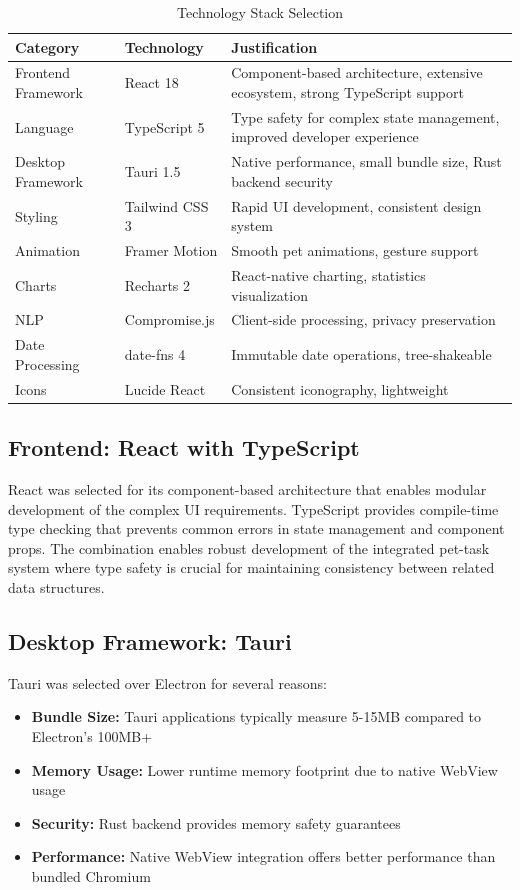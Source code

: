 \begin{table}[htbp]
\centering
\caption{Technology Stack Selection}
\label{tab:tech-stack}
\begin{tabular}{@{}llp{6cm}@{}}
\toprule
\textbf{Category} & \textbf{Technology} & \textbf{Justification} \\
\midrule
Frontend Framework & React 18 & Component-based architecture, extensive ecosystem, strong TypeScript support \\
Language & TypeScript 5 & Type safety for complex state management, improved developer experience \\
Desktop Framework & Tauri 1.5 & Native performance, small bundle size, Rust backend security \\
Styling & Tailwind CSS 3 & Rapid UI development, consistent design system \\
Animation & Framer Motion & Smooth pet animations, gesture support \\
Charts & Recharts 2 & React-native charting, statistics visualization \\
NLP & Compromise.js & Client-side processing, privacy preservation \\
Date Processing & date-fns 4 & Immutable date operations, tree-shakeable \\
Icons & Lucide React & Consistent iconography, lightweight \\
\bottomrule
\end{tabular}
\end{table}

\subsection{Frontend: React with TypeScript}

React was selected for its component-based architecture that enables modular development of the complex UI requirements. TypeScript provides compile-time type checking that prevents common errors in state management and component props. The combination enables robust development of the integrated pet-task system where type safety is crucial for maintaining consistency between related data structures.

\subsection{Desktop Framework: Tauri}

Tauri was selected over Electron for several reasons:
\begin{itemize}
    \item \textbf{Bundle Size:} Tauri applications typically measure 5-15MB compared to Electron's 100MB+
    \item \textbf{Memory Usage:} Lower runtime memory footprint due to native WebView usage
    \item \textbf{Security:} Rust backend provides memory safety guarantees
    \item \textbf{Performance:} Native WebView integration offers better performance than bundled Chromium
\end{itemize}

